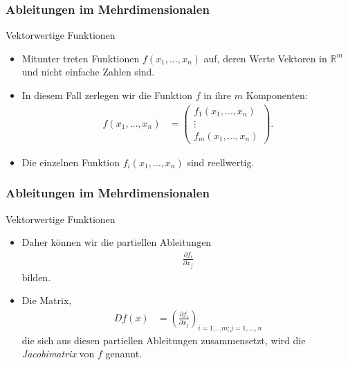 \documentclass{beamer}
\renewcommand{\emph}[1]{{\textcolor{solarizedRed}{\itshape #1}}}
\newcommand\RR{\mathbb R}
\newcommand\bc[1]{\left({#1}\right)}
\renewcommand{\oe}{\"o}
\newcommand{\mytitle}{Ableitungen im Mehrdimensionalen}
\begin{document}
\begin{frame}\frametitle{\mytitle}
	\begin{block}{Vektorwertige Funktionen}
		\begin{itemize}
			\item Mitunter treten Funktionen $f(x_1,\ldots,x_n)$ auf, deren Werte Vektoren in $\RR^m$ und nicht einfache Zahlen sind.
			\item In diesem Fall zerlegen wir die Funktion $f$ in ihre $m$ Komponenten:
				\begin{align*}
					f(x_1,\ldots,x_n)&=\begin{pmatrix}
						f_1(x_1,\ldots,x_n)\\\vdots\\f_m(x_1,\ldots,x_n)
					\end{pmatrix}.
				\end{align*}
			\item Die einzelnen Funktion $f_i(x_1,\ldots,x_n)$ sind reellwertig.
		\end{itemize}
	\end{block}
\end{frame}

\begin{frame}\frametitle{\mytitle}
	\begin{block}{Vektorwertige Funktionen}
		\begin{itemize}
			\item Daher k\oe nnen wir die partiellen Ableitungen
				\begin{align*}
				\frac{\partial f_i}{\partial x_j}
				\end{align*}
				bilden.
			\item Die Matrix, 
\begin{align*}
	Df(x)&=\bc{\frac{\partial f_i}{\partial x_j}}_{i=1,\ldots m;j=1,\ldots,n}
\end{align*}
die sich aus diesen partiellen Ableitungen zusammensetzt, wird die \emph{Jacobimatrix} von $f$ genannt.
		\end{itemize}
	\end{block}
\end{frame}
\end{document}
